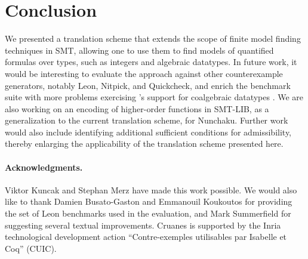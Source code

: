 \section{Conclusion}
\label{sec:conclusion}

We presented a translation scheme that extends the scope of finite model finding
techniques in SMT, allowing one to use them to find models of quantified formulas
over  types, such as integers and algebraic datatypes.
%
In future work, it would be interesting to evaluate the approach against other
counterexample generators, notably Leon, Nitpick, and Quickcheck,
and enrich the benchmark suite with more problems exercising \cvc's support for
coalgebraic datatypes \cite{reynolds-blanchette-2015-codata}.
We are also working on an encoding of higher-order functions in SMT-LIB, as a
generalization to the current translation scheme, for Nunchaku. Further work
would also include identifying additional sufficient conditions for
admissibility, thereby enlarging the applicability of the translation scheme
presented here.


{\footnotesize

\def\ackname{Acknowledgments}
\paragraph{\footnotesize
\ackname.}
Viktor Kuncak and Stephan Merz have made this work possible. We would also like
to thank Damien Busato-Gaston and Emmanouil Koukoutos for providing the
set of Leon benchmarks used in the evaluation, 
and
Mark Summerfield for suggesting
several textual improvements. %
Cruanes is supported by the Inria technological
development action ``Contre-exemples utilisables par Isabelle et Coq'' (CUIC).

}
%

{


}


